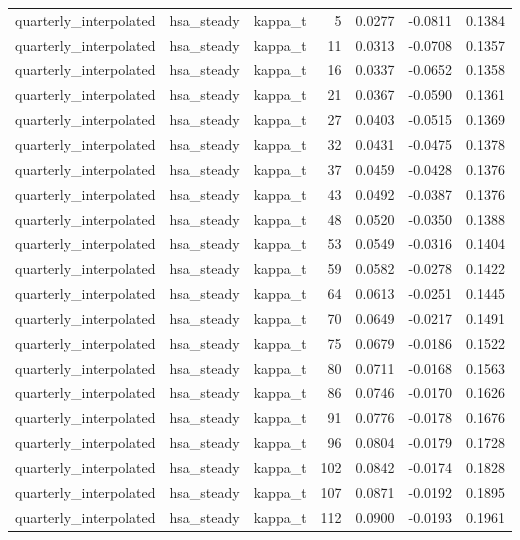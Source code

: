 \begin{tabular}{lllrrrr}
quarterly\_interpolated & hsa\_steady & kappa\_t & 5 & 0.0277 & -0.0811 & 0.1384 \\
quarterly\_interpolated & hsa\_steady & kappa\_t & 11 & 0.0313 & -0.0708 & 0.1357 \\
quarterly\_interpolated & hsa\_steady & kappa\_t & 16 & 0.0337 & -0.0652 & 0.1358 \\
quarterly\_interpolated & hsa\_steady & kappa\_t & 21 & 0.0367 & -0.0590 & 0.1361 \\
quarterly\_interpolated & hsa\_steady & kappa\_t & 27 & 0.0403 & -0.0515 & 0.1369 \\
quarterly\_interpolated & hsa\_steady & kappa\_t & 32 & 0.0431 & -0.0475 & 0.1378 \\
quarterly\_interpolated & hsa\_steady & kappa\_t & 37 & 0.0459 & -0.0428 & 0.1376 \\
quarterly\_interpolated & hsa\_steady & kappa\_t & 43 & 0.0492 & -0.0387 & 0.1376 \\
quarterly\_interpolated & hsa\_steady & kappa\_t & 48 & 0.0520 & -0.0350 & 0.1388 \\
quarterly\_interpolated & hsa\_steady & kappa\_t & 53 & 0.0549 & -0.0316 & 0.1404 \\
quarterly\_interpolated & hsa\_steady & kappa\_t & 59 & 0.0582 & -0.0278 & 0.1422 \\
quarterly\_interpolated & hsa\_steady & kappa\_t & 64 & 0.0613 & -0.0251 & 0.1445 \\
quarterly\_interpolated & hsa\_steady & kappa\_t & 70 & 0.0649 & -0.0217 & 0.1491 \\
quarterly\_interpolated & hsa\_steady & kappa\_t & 75 & 0.0679 & -0.0186 & 0.1522 \\
quarterly\_interpolated & hsa\_steady & kappa\_t & 80 & 0.0711 & -0.0168 & 0.1563 \\
quarterly\_interpolated & hsa\_steady & kappa\_t & 86 & 0.0746 & -0.0170 & 0.1626 \\
quarterly\_interpolated & hsa\_steady & kappa\_t & 91 & 0.0776 & -0.0178 & 0.1676 \\
quarterly\_interpolated & hsa\_steady & kappa\_t & 96 & 0.0804 & -0.0179 & 0.1728 \\
quarterly\_interpolated & hsa\_steady & kappa\_t & 102 & 0.0842 & -0.0174 & 0.1828 \\
quarterly\_interpolated & hsa\_steady & kappa\_t & 107 & 0.0871 & -0.0192 & 0.1895 \\
quarterly\_interpolated & hsa\_steady & kappa\_t & 112 & 0.0900 & -0.0193 & 0.1961 \\

\end{tabular}
